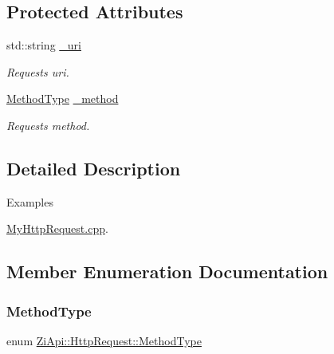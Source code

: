\subsection*{Protected Attributes}
\begin{DoxyCompactItemize}
\item 
\mbox{\label{classZiApi_1_1HttpRequest_a30de96436841e7f49ce9d9f6a69f751e}} 
std\+::string \mbox{\hyperlink{classZiApi_1_1HttpRequest_a30de96436841e7f49ce9d9f6a69f751e}{\+\_\+uri}}
\begin{DoxyCompactList}\small\item\em Request\textquotesingle{}s uri. \end{DoxyCompactList}\item 
\mbox{\label{classZiApi_1_1HttpRequest_ad4e4fe2662f4699ad6715fc11bf454df}} 
\mbox{\hyperlink{classZiApi_1_1HttpRequest_a8592cff867cbbc5cc43bd3a4d6053a1b}{Method\+Type}} \mbox{\hyperlink{classZiApi_1_1HttpRequest_ad4e4fe2662f4699ad6715fc11bf454df}{\+\_\+method}}
\begin{DoxyCompactList}\small\item\em Request\textquotesingle{}s method. \end{DoxyCompactList}\end{DoxyCompactItemize}


\subsection{Detailed Description}
\begin{Desc}
\item[Examples]\par
\mbox{\hyperlink{MyHttpRequest_8cpp-example}{My\+Http\+Request.\+cpp}}.\end{Desc}


\subsection{Member Enumeration Documentation}
\mbox{\label{classZiApi_1_1HttpRequest_a8592cff867cbbc5cc43bd3a4d6053a1b}} 
\subsubsection{\texorpdfstring{MethodType}{MethodType}}
{\footnotesize\ttfamily enum \mbox{\hyperlink{classZiApi_1_1HttpRequest_a8592cff867cbbc5cc43bd3a4d6053a1b}{Zi\+Api\+::\+Http\+Request\+::\+Method\+Type}}\hspace{0.3cm}{\ttfamily [strong]}}

